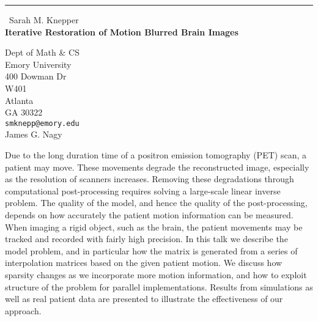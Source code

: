 \documentclass{report}
\begin{document}
\begin{center}
\rule{6in}{1pt} \
{\large Sarah M. Knepper \\
{\bf Iterative Restoration of Motion Blurred Brain Images}}

Dept of Math & CS \\ Emory University \\ 400 Dowman Dr  \\ W401 \\ Atlanta \\ GA 30322
\\
{\tt smknepp@emory.edu}\\
James G. Nagy\end{center}

Due to the long duration time of a positron emission tomography (PET)
scan, a patient may move. These movements degrade the reconstructed
image, especially as the resolution of scanners increases. Removing these
degradations through computational post-processing requires solving a
large-scale linear inverse problem. The quality of the model, and hence
the quality of the post-processing, depends on how accurately the patient
motion information can be measured. When imaging a rigid object, such as
the brain, the patient movements may be tracked and recorded with fairly
high precision. In this talk we describe the model problem, and in
particular how the matrix is generated from a series of interpolation
matrices based on the given patient motion. We discuss how sparsity
changes as we incorporate more motion information, and how to exploit
structure of the problem for parallel implementations. Results from
simulations as well as real patient data are presented to illustrate the
effectiveness of our approach.
\end{document}
